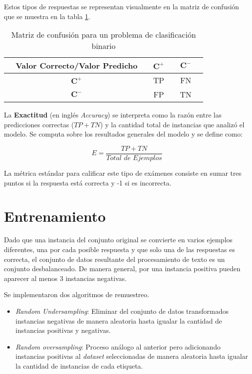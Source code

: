 Estos tipos de respuestas se representan visualmente en la matriz de confusión que se muestra en la tabla \ref{tab:confusion}.

\begin{table}[h!]
  \caption{Matriz de confusión para un problema de clasificación binario}
  \begin{center}
    \begin{tabular}{ccc|cc|cc}
        & Valor Correcto/Valor Predicho &    & $\mathbf{C}^{\boldsymbol{+}}$ & & $\mathbf{C}^{\boldsymbol{-}}$  \\
        \hline
        & $\mathbf{C}^{\boldsymbol{+}}$ &   & TP & & FN  \\
        \hline
        & $\mathbf{C}^{\boldsymbol{-}}$ &   & FP & & TN  \\
    \end{tabular}
  \end{center}
  \label{tab:confusion}
\end{table}

La \textbf{Exactitud} (en inglés \textit{Accuracy}) se interpreta como la razón entre las predicciones correctas ($TP + TN$) y la cantidad total de instancias que analizó el modelo. Se computa sobre los resultados generales del modelo y se define como:

\begin{equation}
  E = \frac{TP + TN}{\textit{Total de Ejemplos}}
\end{equation}

La métrica estándar para calificar este tipo de exámenes consiste en sumar tres puntos si la respuesta está correcta y -1 si es incorrecta.

\section{Entrenamiento}

Dado que una instancia del conjunto original se convierte en varios ejemplos diferentes, una por cada posible respuesta y que solo una de las respuestas es correcta, el conjunto de datos resultante del procesamiento de texto es un conjunto desbalanceado. De manera general, por una instancia positiva pueden aparecer al menos 3 instancias negativas.

Se implementaron dos algoritmos de remuestreo.

\begin{itemize}
  \item \textit{Random Undersampling}: Eliminar del conjunto de datos transformados instancias negativas de manera aleatoria  hasta igualar la cantidad de instancias positivas y negativas.
  \item \textit{Random oversampling}: Proceso análogo al anterior pero adicionando instancias positivas al \textit{dataset} seleccionadas de manera aleatoria hasta igualar la cantidad de instancias de cada etiqueta.
\end{itemize}


